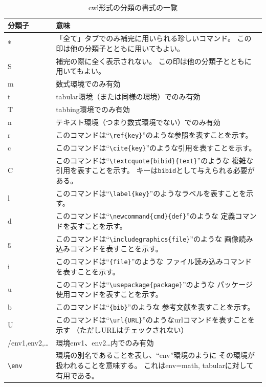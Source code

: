 \begin{table}[H]
  \centering
  \caption{cwl形式の分類の書式の一覧}
  \begin{tabularx}{\linewidth}{lX}
    \hline
    \textbf{分類子} & \textbf{意味}\\
    \hline
    * & 「全て」タブでのみ補完に用いられる珍しいコマンド。
      この印は他の分類子とともに用いてもよい。\\
    S & 補完の際に全く表示されない。 この印は他の分類子とともに用いてもよい。\\
    m & 数式環境でのみ有効\\
    t & tabular環境（または同様の環境）でのみ有効\\
    T & tabbing環境でのみ有効\\
    n & テキスト環境（つまり数式環境でない）でのみ有効\\
    r & このコマンドは``\verb+\ref+\verb+{key}+''のような参照を表すことを示す。\\
    c & このコマンドは``\verb+\cite+\verb+{key}+''のような引用を表すことを示す。\\
    C & このコマンドは``\verb+\textcquote+\verb+{bibid}{text}+''のような
      複雑な引用を表すことを示す。
      キーは\verb+bibid+として与えられる必要がある。\\
    l & このコマンドは``\verb+\label+\verb+{key}+''のようなラベルを表すことを示す。\\
    d & このコマンドは``\verb+\newcommand+\verb+{cmd}{def}+''のような
      定義コマンドを表すことを示す。\\
    g & このコマンドは``\verb+\includegraphics+\verb+{file}+''のような
      画像読み込みコマンドを表すことを示す。\\
    i & このコマンドは``\verb++\verb+{file}+''のような
      ファイル読み込みコマンドを表すことを示す。\\
    u & このコマンドは``\verb+\usepackage+\verb+{package}+''のような
      パッケージ使用コマンドを表すことを示す。\\
    b & このコマンドは``\verb++\verb+{bib}+''のような
      参考文献を表すことを示す。\\
    U & このコマンドは``\verb+\url+\verb+{URL}+''のようなurlコマンドを表すことを示す
      （ただしURLはチェックされない）\\
    /env1,env2,\ldots{} & 環境env1、env2\ldots{}内でのみ有効\\
    \verb+\env+ & 環境の別名であることを表し、``env''環境のように
      その環境が扱われることを意味する。
      これはenv=math, tabularに対して有用である。\\
    \hline
  \end{tabularx}
\end{table}


